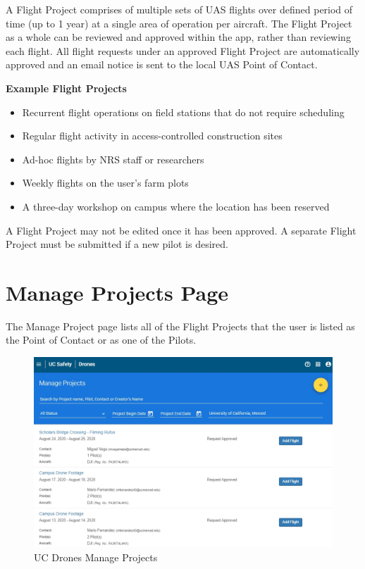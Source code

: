 \documentclass[
]{book}
\providecommand{\tightlist}{%
  \setlength{\itemsep}{0pt}\setlength{\parskip}{0pt}}
\begin{document}
A Flight Project comprises of multiple sets of UAS flights over defined period of time (up to 1 year) at a single area of operation per aircraft. The Flight Project as a whole can be reviewed and approved within the app, rather than reviewing each flight. All flight requests under an approved Flight Project are automatically approved and an email notice is sent to the local UAS Point of Contact.

\textbf{Example Flight Projects}

\begin{itemize}
\tightlist
\item
  Recurrent flight operations on field stations that do not require scheduling
\item
  Regular flight activity in access-controlled construction sites
\item
  Ad-hoc flights by NRS staff or researchers
\item
  Weekly flights on the user's farm plots
\item
  A three-day workshop on campus where the location has been reserved
\end{itemize}

A Flight Project may not be edited once it has been approved. A separate Flight Project must be submitted if a new pilot is desired.

\hypertarget{manage-projects-page}{%
\section{Manage Projects Page}\label{manage-projects-page}}

The Manage Project page lists all of the Flight Projects that the user is listed as the Point of Contact or as one of the Pilots.

\begin{figure}

{\centering \includegraphics[width=0.85\linewidth]{images/UCDrones_manage_project} 

}

\caption{UC Drones Manage Projects}\label{fig:UCDrones-project}
\end{figure}
\end{document}
